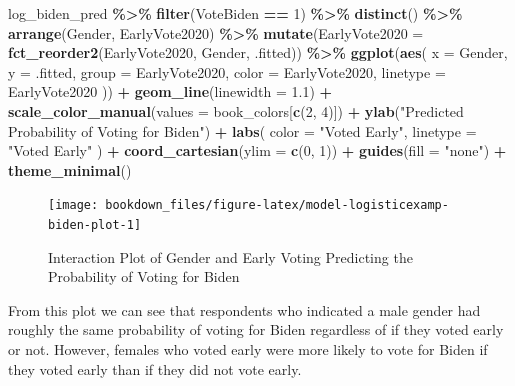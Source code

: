 \documentclass[
]{krantz}
\makeatletter
\newenvironment{Shaded}{\begin{snugshade}}{\end{snugshade}}
\newcommand{\AttributeTok}[1]{\textcolor[rgb]{0.27,0.27,0.27}{#1}}
\newcommand{\DecValTok}[1]{\textcolor[rgb]{0.06,0.06,0.06}{#1}}
\newcommand{\FloatTok}[1]{\textcolor[rgb]{0.06,0.06,0.06}{#1}}
\newcommand{\FunctionTok}[1]{\textcolor[rgb]{0.27,0.27,0.27}{\textbf{#1}}}
\newcommand{\NormalTok}[1]{#1}
\newcommand{\SpecialCharTok}[1]{\textcolor[rgb]{0.43,0.43,0.43}{\textbf{#1}}}
\newcommand{\StringTok}[1]{\textcolor[rgb]{0.5,0.5,0.5}{#1}}
\newenvironment{kframe}{%
\medskip{}
\setlength{\fboxsep}{.8em}
 \def\at@end@of@kframe{}%
 \ifinner\ifhmode%
  \def\at@end@of@kframe{\end{minipage}}%
  \begin{minipage}{\columnwidth}%
 \fi\fi%
 \def\FrameCommand##1{\hskip\@totalleftmargin \hskip-\fboxsep
 \colorbox{shadecolor}{##1}\hskip-\fboxsep
     \hskip-\linewidth \hskip-\@totalleftmargin \hskip\columnwidth}%
 \MakeFramed {\advance\hsize-\width
   \@totalleftmargin\z@ \linewidth\hsize
   \@setminipage}}%
 {\par\unskip\endMakeFramed%
 \at@end@of@kframe}
\renewenvironment{Shaded}{\begin{kframe}}{\end{kframe}}
\makeatother
\begin{document}
\begin{Shaded}
\begin{Highlighting}[]
\NormalTok{log\_biden\_pred }\SpecialCharTok{\%\textgreater{}\%}
  \FunctionTok{filter}\NormalTok{(VoteBiden }\SpecialCharTok{==} \DecValTok{1}\NormalTok{) }\SpecialCharTok{\%\textgreater{}\%}
  \FunctionTok{distinct}\NormalTok{() }\SpecialCharTok{\%\textgreater{}\%}
  \FunctionTok{arrange}\NormalTok{(Gender, EarlyVote2020) }\SpecialCharTok{\%\textgreater{}\%}
  \FunctionTok{mutate}\NormalTok{(}\AttributeTok{EarlyVote2020 =} \FunctionTok{fct\_reorder2}\NormalTok{(EarlyVote2020, Gender, .fitted)) }\SpecialCharTok{\%\textgreater{}\%}
  \FunctionTok{ggplot}\NormalTok{(}\FunctionTok{aes}\NormalTok{(}
    \AttributeTok{x =}\NormalTok{ Gender, }\AttributeTok{y =}\NormalTok{ .fitted, }\AttributeTok{group =}\NormalTok{ EarlyVote2020,}
    \AttributeTok{color =}\NormalTok{ EarlyVote2020, }\AttributeTok{linetype =}\NormalTok{ EarlyVote2020}
\NormalTok{  )) }\SpecialCharTok{+}
  \FunctionTok{geom\_line}\NormalTok{(}\AttributeTok{linewidth =} \FloatTok{1.1}\NormalTok{) }\SpecialCharTok{+}
  \FunctionTok{scale\_color\_manual}\NormalTok{(}\AttributeTok{values =}\NormalTok{ book\_colors[}\FunctionTok{c}\NormalTok{(}\DecValTok{2}\NormalTok{, }\DecValTok{4}\NormalTok{)]) }\SpecialCharTok{+}
  \FunctionTok{ylab}\NormalTok{(}\StringTok{"Predicted Probability of Voting for Biden"}\NormalTok{) }\SpecialCharTok{+}
  \FunctionTok{labs}\NormalTok{(}
    \AttributeTok{color =} \StringTok{"Voted Early"}\NormalTok{,}
    \AttributeTok{linetype =} \StringTok{"Voted Early"}
\NormalTok{  ) }\SpecialCharTok{+}
  \FunctionTok{coord\_cartesian}\NormalTok{(}\AttributeTok{ylim =} \FunctionTok{c}\NormalTok{(}\DecValTok{0}\NormalTok{, }\DecValTok{1}\NormalTok{)) }\SpecialCharTok{+}
  \FunctionTok{guides}\NormalTok{(}\AttributeTok{fill =} \StringTok{"none"}\NormalTok{) }\SpecialCharTok{+}
  \FunctionTok{theme\_minimal}\NormalTok{()}
\end{Highlighting}
\end{Shaded}

\begin{figure}
\texttt{[image: bookdown\_files/figure-latex/model-logisticexamp-biden-plot-1]} \caption{Interaction Plot of Gender and Early Voting Predicting the Probability of Voting for Biden}\label{fig:model-logisticexamp-biden-plot}
\end{figure}

From this plot we can see that respondents who indicated a male gender had roughly the same probability of voting for Biden regardless of if they voted early or not. However, females who voted early were more likely to vote for Biden if they voted early than if they did not vote early.
\end{document}
